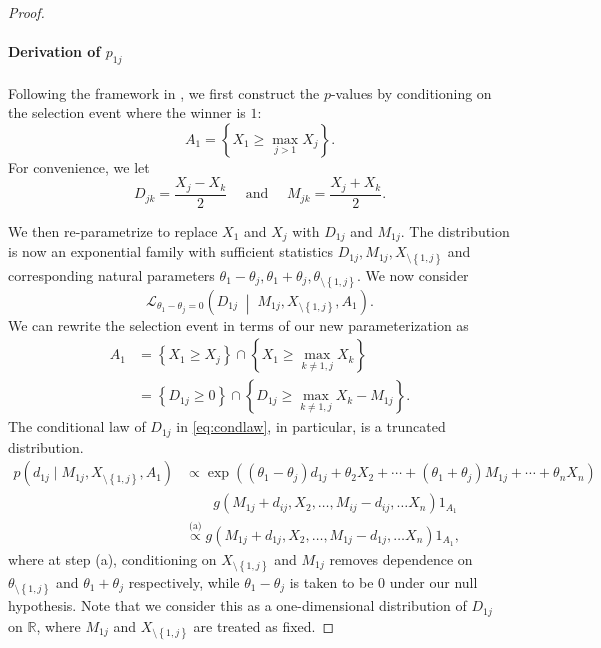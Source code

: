 \documentclass[aos, authoryear]{imsart}
\theoremstyle{definition}
\theoremstyle{custom}
\newcommand{\RR}{\mathbb{R}}
\begin{document}
\begin{proof}
\paragraph{Derivation of $p_{1j}$}

Following the framework in \citet{Fithian:2014ws}, we first construct the $p$-values by conditioning on the selection event where the winner is $1$: 
\[A_1 = \left\{X_1 \ge \max_{j > 1} X_j\right\}.\]
For convenience, we let
\[D_{jk} = \frac{X_j - X_k}{2} \quad \text{ and } \quad M_{jk} = \frac{X_j + X_k}{2}.\]

We then re-parametrize to replace $X_1$ and $X_j$ with $D_{1j}$ and $M_{1j}$. The distribution is now an exponential family with sufficient statistics $D_{1j}, M_{1j}, X_{\setminus\left\{1, j\right\}}$ and corresponding natural parameters $\theta_1 - \theta_j, \theta_1 + \theta_j, \theta_{\setminus\left\{1, j\right\}}$. We now consider
\begin{equation}
\label{eq:condlaw}
\mathcal{L}_{\theta_1 - \theta_j = 0} \left(D_{1j} \;\middle|\; M_{1j}, X_{\setminus\left\{1, j\right\}}, A_1\right).
\end{equation}
We can rewrite the selection event in terms of our new parameterization as
\begin{align*}
A_1 &= \left\{X_1 \ge X_j\right\} \cap \left\{X_1 \ge \max_{k \neq 1,j} X_k\right\}\\
&= \left\{D_{1j} \ge 0\right\} \cap \left\{D_{1j} \ge \max_{k \ne 1, j} X_k - M_{1j}\right\}.
\end{align*}
The conditional law of $D_{1j}$ in \eqref{eq:condlaw}, in particular, is a truncated distribution.
\begin{align*}
p\left(d_{1j} \mid M_{1j}, X_{\setminus\left\{1, j\right\}}, A_1\right) & \propto \exp\left(\left(\theta_1 - \theta_j\right) d_{1j} + \theta_2 X_2 + \cdots + \left(\theta_1 + \theta_j\right) M_{1j} + \cdots + \theta_n X_n \right) \\
& \quad\quad g\left(M_{1j} + d_{ij}, X_2, \ldots, M_{ij} - d_{ij}, \ldots X_n\right) 1_{A_1} \\
& \stackrel{\text{(a)}}{\propto} g\left(M_{1j} + d_{1j}, X_2, \ldots, M_{1j} - d_{1j}, \ldots X_n\right) 1_{A_1},
\end{align*}
where at step (a), conditioning on $X_{\setminus\left\{1, j\right\}}$ and $M_{1j}$ removes dependence on $\theta_{\setminus\left\{1, j\right\}}$ and $\theta_1 + \theta_j$ respectively, while $\theta_1 - \theta_j$ is taken to be $0$ under our null hypothesis. Note that we consider this as a one-dimensional distribution of $D_{1j}$ on $\RR$, where $M_{1j}$ and $X_{\setminus\left\{1, j\right\}}$ are treated as fixed.


\end{proof}
\end{document}
